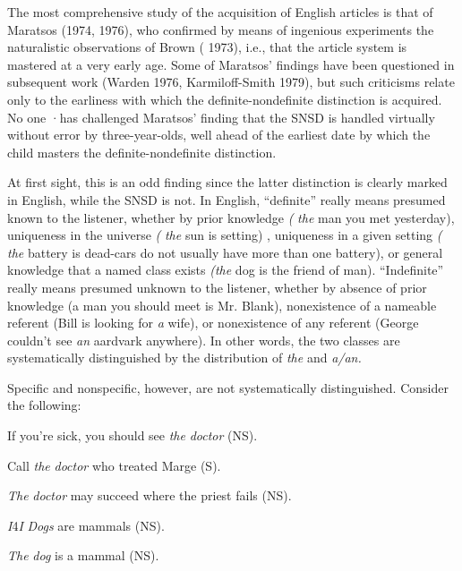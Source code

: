 The most comprehensive study of the acquisition of English articles is that of Maratsos (1974, 1976), who confirmed by means of ingenious experiments the naturalistic observations of Brown ( 1973), i.e., that the article system is mastered at a very early age. Some of Maratsos' findings have been questioned in subsequent work (Warden 1976, Karmiloff-Smith 1979), but such criticisms relate only to the earliness with which the definite-nondefinite distinction is acquired. No one ·has challenged Maratsos' finding that the SNSD is handled virtually without error by three-year-olds, well ahead of the earliest date by which the child masters the definite-nondefinite distinction.

At first sight, this is an odd finding since the latter distinction is clearly marked in English, while the SNSD is not. In English, ``definite'' really means presumed known to the listener, whether by prior knowledge \textit{(} \textit{{\textquotedbl}the} man you met yesterday{\textquotedbl}), uniqueness in the universe \textit{(} \textit{{\textquotedbl}the} sun is setting{\textquotedbl}) , uniqueness in a given setting \textit{(} \textit{{\textquotedbl}the} battery is dead{\textquotedbl}-cars do not usually have more than one battery), or general knowledge that a named class exists \textit{({\textquotedbl}the} dog is the friend of man{\textquotedbl}). ``Indefinite'' really means presumed unknown to the listener, whether by absence of prior knowledge ({\textquotedbl}a man you should meet is Mr. Blank{\textquotedbl}), nonexistence of a nameable referent ({\textquotedbl}Bill is looking for \textit{a} wife{\textquotedbl}), or nonexistence of any referent ({\textquotedbl}George couldn't see \textit{an} aardvark anywhere{\textquotedbl}). In other words, the two classes are systematically distinguished by the distribution of \textit{the} and \textit{a/an.}

Specific and nonspecific, however, are not systematically dis\-tinguished. Consider the following:

\ea\label{ex:1}
 If you're sick, you should see \textit{the} \textit{doctor} (NS).
\glt
\z

\ea\label{ex:2}
 Call \textit{the} \textit{doctor} who treated Marge (S).
\glt
\z

\ea\label{ex:3}
 \textit{The} \textit{doctor} may succeed where the priest fails (NS).
\glt
\z

\textit{I}4\textit{I }\textit{Dogs} are mammals (NS).

\ea\label{ex:5}
 \textit{The} \textit{dog} is a mammal (NS).
\glt
\z


